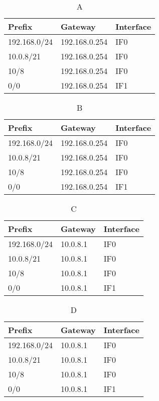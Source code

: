 \documentclass[a4paper]{scrartcl}
\begin{document}
\begin{table}[!htb]
\centering
\caption{A}
\label{tab:my-table}
\begin{tabular}{|l|l|l|}
\hline
Prefix       & Gateway       & Interface \\ \hline
192.168.0/24 & 192.168.0.254 & IF0       \\ \hline
10.0.8/21    & 192.168.0.254 & IF0       \\ \hline
10/8         & 192.168.0.254 & IF0       \\ \hline
0/0          & 192.168.0.254 & IF1       \\ \hline
\end{tabular}
\end{table}

\begin{table}[]
\centering
\caption{B}
\label{tab:my-table}
\begin{tabular}{|l|l|l|}
\hline
Prefix       & Gateway       & Interface \\ \hline
192.168.0/24 & 192.168.0.254 & IF0       \\ \hline
10.0.8/21    & 192.168.0.254 & IF0       \\ \hline
10/8         & 192.168.0.254 & IF0       \\ \hline
0/0          & 192.168.0.254 & IF1       \\ \hline
\end{tabular}
\end{table}

\begin{table}[]
\centering
\caption{C}
\label{tab:my-table}
\begin{tabular}{|l|l|l|}
\hline
Prefix       & Gateway  & Interface \\ \hline
192.168.0/24 & 10.0.8.1 & IF0       \\ \hline
10.0.8/21    & 10.0.8.1 & IF0       \\ \hline
10/8         & 10.0.8.1 & IF0       \\ \hline
0/0          & 10.0.8.1 & IF1       \\ \hline
\end{tabular}
\end{table}

\begin{table}[]
\centering
\caption{D}
\label{tab:my-table}
\begin{tabular}{|l|l|l|}
\hline
Prefix       & Gateway  & Interface \\ \hline
192.168.0/24 & 10.0.8.1 & IF0       \\ \hline
10.0.8/21    & 10.0.8.1 & IF0       \\ \hline
10/8         & 10.0.8.1 & IF0       \\ \hline
0/0          & 10.0.8.1 & IF1       \\ \hline
\end{tabular}
\end{table}
\end{document}
